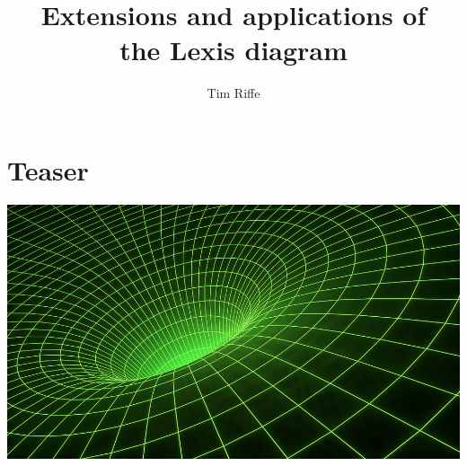 \documentclass[20pt]{beamer}
\title{Extensions and applications of \\ the Lexis diagram}
\subtitle{Tim Riffe}		%
\begin{document}

\begin{frame}
	\titlepage
\end{frame}


\section{Teaser}

\begin{frame}
\vspace{-15em}
\begin{center}
\vspace{4.25cm}
\hspace*{-6cm}\includegraphics[scale=1]{Figures/spacegrid.jpg}
\end{center}
\end{frame}
%
\end{document}
